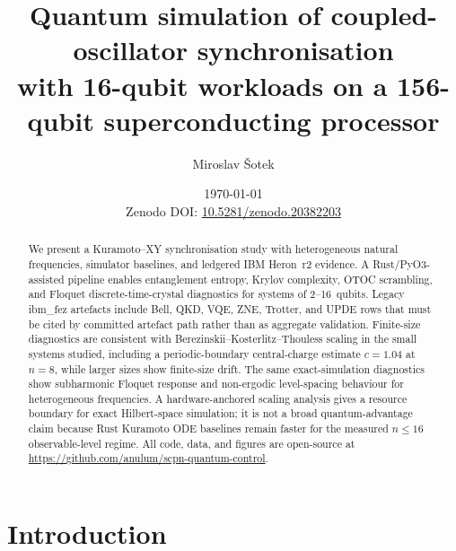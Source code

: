 \documentclass[twocolumn,prl,superscriptaddress,showpacs,floatfix]{revtex4-2}
\newcommand{\paperdoi}{Zenodo DOI: \href{https://doi.org/10.5281/zenodo.20382203}{10.5281/zenodo.20382203}}
\begin{document}
\title{Quantum simulation of coupled-oscillator synchronisation\\
with 16-qubit workloads on a 156-qubit superconducting processor}

\author{Miroslav \v{S}otek}

\date{\today\\\paperdoi}

\begin{abstract}
We present a Kuramoto--XY synchronisation study with heterogeneous natural
frequencies, simulator baselines, and ledgered IBM Heron~r2 evidence. A
Rust/PyO3-assisted pipeline enables entanglement entropy, Krylov complexity,
OTOC scrambling, and Floquet discrete-time-crystal diagnostics for systems
of 2--16~qubits. Legacy ibm\_fez artefacts include
Bell, QKD, VQE, ZNE, Trotter, and UPDE rows that must be cited by committed
artefact path rather than as aggregate validation. Finite-size diagnostics are
consistent with Berezinskii--Kosterlitz--Thouless scaling in the small
systems studied, including a periodic-boundary central-charge estimate
$c = 1.04$ at $n = 8$, while larger sizes show finite-size drift. The
same exact-simulation diagnostics show subharmonic Floquet response and
non-ergodic level-spacing behaviour for heterogeneous frequencies. A
hardware-anchored scaling analysis gives a resource boundary for exact
Hilbert-space simulation; it is not a broad quantum-advantage claim because
Rust Kuramoto ODE baselines remain faster for the measured $n \leq 16$
observable-level regime.
All code, data, and figures are open-source at
\url{https://github.com/anulum/scpn-quantum-control}.
\end{abstract}

\maketitle

\section{Introduction}
\end{document}
